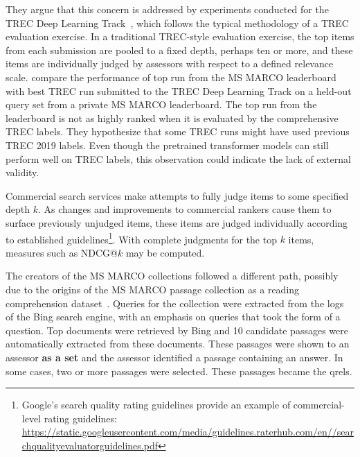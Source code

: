 \documentclass[fullpage]{article}
\begin{document}
They argue that this concern is addressed by experiments conducted for the TREC Deep Learning Track~\cite{craswell2020overview,DBLP:journals/corr/abs-2102-07662}, which follows the typical methodology of a TREC evaluation exercise. In a traditional TREC-style evaluation exercise, the top items from each submission are pooled to a fixed depth,  perhaps ten or more, and these items are individually judged by assessors with respect to a defined relevance scale. \citet{marco21full} compare the performance of top run from the MS MARCO leaderboard with best TREC run submitted to the TREC Deep Learning Track on a held-out query set from a private MS MARCO leaderboard. The top run from the leaderboard is not as highly ranked when it is evaluated by the comprehensive TREC labels. They hypothesize that some TREC runs might have used previous TREC 2019 labels. Even though the pretrained transformer models can still perform well on TREC labels, this observation could indicate the lack of external validity. %

Commercial search services make attempts to fully judge items to some specified depth $k$. As changes and improvements to commercial rankers cause them to surface previously unjudged items, these items are judged individually according to established guidelines\footnote{Google's search quality rating guidelines provide an example of commercial-level rating guidelines:  \url{https://static.googleusercontent.com/media/guidelines.raterhub.com/en//searchqualityevaluatorguidelines.pdf}}. With complete judgments for the top $k$ items, measures such as NDCG@$k$ may be computed.

The creators of the MS MARCO collections followed a different path, possibly due to the origins of the MS MARCO passage collection as a reading comprehension dataset~\cite{nguyen2016ms}. Queries for the collection were extracted from the logs of the Bing search engine, with an emphasis on queries that took the form of a question. Top documents were retrieved by Bing and 10 candidate passages were automatically extracted from these documents. These passages were shown to an assessor {\bf as a set} and the assessor identified a passage containing an answer. In some cases, two or more passages were selected. These passages became the qrels.
\end{document}
